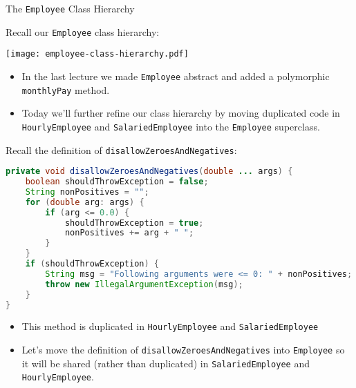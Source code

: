 \documentclass{beamer}
\author[Chris Simpkins] 
{Christopher Simpkins \\\texttt{chris.simpkins@gatech.edu}}
\institute[Georgia Tech] %
\date[CS 1331]{}
\begin{document}
\begin{frame}
  \titlepage
\end{frame}


\begin{frame}[fragile]{The {\tt Employee} Class Hierarchy}


Recall our {\tt Employee} class hierarchy:
\vspace{-.1in}
\begin{center}
\texttt{[image: employee-class-hierarchy.pdf]}
\end{center}
\begin{itemize}
\item In the last lecture we made {\tt Employee} abstract and added a polymorphic {\tt monthlyPay} method.
\item Today we'll further refine our class hierarchy by moving duplicated code in {\tt HourlyEmployee} and {\tt SalariedEmployee} into the {\tt Employee} superclass.
\end{itemize}
\end{frame}

\begin{frame}[fragile]{}


Recall the definition of {\tt disallowZeroesAndNegatives}:
\begin{lstlisting}[language=Java]
private void disallowZeroesAndNegatives(double ... args) {
    boolean shouldThrowException = false;
    String nonPositives = "";
    for (double arg: args) {
        if (arg <= 0.0) {
            shouldThrowException = true;
            nonPositives += arg + " ";
        }
    }
    if (shouldThrowException) {
        String msg = "Following arguments were <= 0: " + nonPositives;
        throw new IllegalArgumentException(msg);
    }
}
\end{lstlisting}

\begin{itemize}
\item This method is duplicated in {\tt HourlyEmployee} and {\tt SalariedEmployee}
\item Let's move the definition of {\tt disallowZeroesAndNegatives} into {\tt Employee} so it will be shared (rather than duplicated) in {\tt SalariedEmployee} and {\tt HourlyEmployee}.
\end{itemize}


\end{frame}
\end{document}
